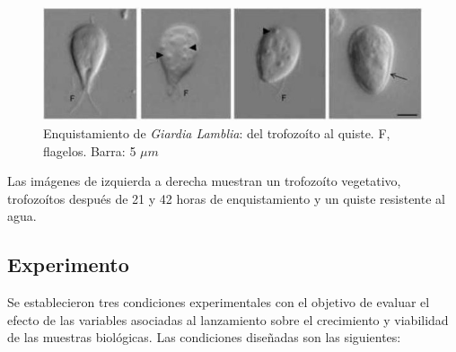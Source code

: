     \begin{figure}[H]
      \centering
      \includegraphics[width=1\textwidth]{./image/Giardia/Enquistamiento.jpg}
      \caption{Enquistamiento de \textit{Giardia Lamblia}: del trofozoíto al quiste. F, flagelos. Barra: 5 $\mu m$}
      \label{fig:enquistamiento}
    \end{figure}

    Las imágenes de izquierda a derecha muestran un trofozoíto vegetativo, trofozoítos después de 21 y
    42 horas de enquistamiento y un quiste resistente al agua. \cite{Lauwaet2007-te}

  \subsection{Experimento}
    Se establecieron tres condiciones experimentales con el objetivo de evaluar el efecto de las
    variables asociadas al lanzamiento sobre el crecimiento y viabilidad de las muestras biológicas.
    Las condiciones diseñadas son las siguientes:
 

